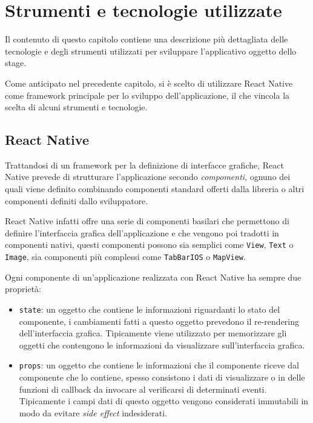 
\chapter{Strumenti e tecnologie utilizzate}
\label{cap:strumenti-tecnologie}

Il contenuto di questo capitolo contiene una descrizione più dettagliata delle tecnologie e degli strumenti utilizzati per sviluppare l'applicativo oggetto dello stage.

Come anticipato nel precedente capitolo, si è scelto di utilizzare React Native come framework principale per lo sviluppo dell'applicazione, il che vincola la scelta di alcuni strumenti e tecnologie.

\section{React Native}

Trattandosi di un framework per la definizione di interfacce grafiche, React Native prevede di strutturare l'applicazione secondo \textit{compomenti}, ognuno dei quali viene definito combinando componenti standard offerti dalla libreria o altri componenti definiti dallo sviluppatore.

React Native infatti offre una serie di componenti basilari che permettono di definire l'interfaccia grafica dell'applicazione e che vengono poi tradotti in componenti nativi, questi componenti possono sia semplici come \texttt{View}, \texttt{Text} o \texttt{Image}, sia componenti più complessi come \texttt{TabBarIOS} o \texttt{MapView}.

Ogni componente di un'applicazione realizzata con React Native ha sempre due proprietà:
\begin{itemize}
\item \texttt{state}: un oggetto che contiene le informazioni riguardanti lo stato del componente, i cambiamenti fatti a questo oggetto prevedono il re-rendering dell'interfaccia grafica. Tipicamente viene utilizzato per memorizzare gli oggetti che contengono le informazioni da visualizzare sull'interfaccia grafica.
\item \texttt{props}: un oggetto che contiene le informazioni che il componente riceve dal componente che lo contiene, spesso consistono i dati di visualizzare o in delle funzioni di callback da invocare al verificarsi di determinati eventi. Tipicamente i campi dati di questo oggetto vengono considerati immutabili in modo da evitare \textit{side effect} indesiderati.
\end{itemize}

